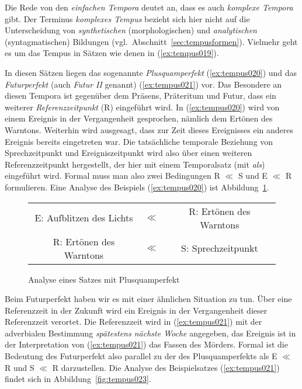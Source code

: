 Die Rede von den \textit{einfachen Tempora} deutet an, dass es auch \textit{komplexe Tempora} gibt.
Der Terminus \textit{komplexes Tempus} bezieht sich hier nicht auf die Unterscheidung von \textit{synthetischen} (morphologischen) und \textit{analytischen} (syntagmatischen) Bildungen (vgl.\ Abschnitt~\ref{sec:tempusformen}).
Vielmehr geht es um das Tempus in Sätzen wie denen in (\ref{ex:tempus019}).

\begin{exe}
  \ex\label{ex:tempus019}
  \begin{xlist}
  \end{xlist}
\end{exe}


In diesen Sätzen liegen das sogenannte \textit{Plusquamperfekt} (\ref{ex:tempus020}) und das \textit{Futurperfekt} (auch \textit{Futur II} genannt) (\ref{ex:tempus021}) vor.
Das Besondere an diesen Tempora ist gegenüber dem Präsens, Präteritum und Futur, dass ein weiterer \textit{Referenzzeitpunkt} (R) eingeführt wird.
In (\ref{ex:tempus020}) wird von einem Ereignis in der Vergangenheit gesprochen, nämlich dem Ertönen des Warntons.
Weiterhin wird ausgesagt, dass zur Zeit dieses Ereignisses ein anderes Ereignis bereits eingetreten war.
Die tatsächliche temporale Beziehung von Sprechzeitpunkt und Ereigniszeitpunkt wird also über einen weiteren Referenzzeitpunkt hergestellt, der hier mit einem Temporalsatz (mit \textit{als}) eingeführt wird.
Formal muss man also zwei Bedingungen R $\ll$ S und E $\ll$ R formulieren.
Eine Analyse des Beispiels (\ref{ex:tempus020}) ist Abbildung~\ref{fig:tempus022}.

\begin{figure}[!htbp]
  \centering
  \begin{tabular}{ccc}
    E: Aufblitzen des Lichts & $\ll$ & R: Ertönen des Warntons \\
    R: Ertönen des Warntons & $\ll$ & S: Sprechzeitpunkt \\
  \end{tabular}
  \caption{Analyse eines Satzes mit Plusquamperfekt}
  \label{fig:tempus022}
\end{figure}

Beim Futurperfekt haben wir es mit einer ähnlichen Situation zu tun.
Über eine Referenzzeit in der Zukunft wird ein Ereignis in der Vergangenheit dieser Referenzzeit verortet.
Die Referenzzeit wird in (\ref{ex:tempus021}) mit der adverbialen Bestimmung \textit{spätestens nächste Woche} angegeben, das Ereignis ist in der Interpretation von (\ref{ex:tempus021}) das Fassen des Mörders.
Formal ist die Bedeutung des Futurperfekt also parallel zu der des Plusquamperfekts als E $\ll$ R und  S $\ll$ R darzustellen.
Die Analyse des Beispielsatzes (\ref{ex:tempus021}) findet sich in Abbildung~\ref{fig:tempus023}.

